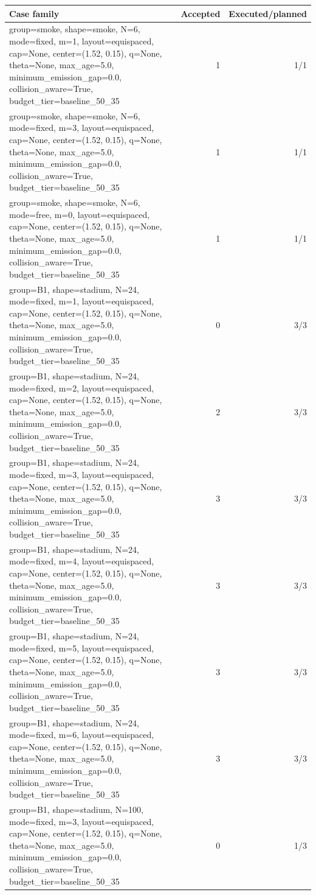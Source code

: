 \begin{tabular}{p{11cm}rr}
Case family & Accepted & Executed/planned \\
\hline
group=smoke, shape=smoke, N=6, mode=fixed, m=1, layout=equispaced, cap=None, center=(1.52, 0.15), q=None, theta=None, max\_age=5.0, minimum\_emission\_gap=0.0, collision\_aware=True, budget\_tier=baseline\_50\_35 & 1 & 1/1 \\
group=smoke, shape=smoke, N=6, mode=fixed, m=3, layout=equispaced, cap=None, center=(1.52, 0.15), q=None, theta=None, max\_age=5.0, minimum\_emission\_gap=0.0, collision\_aware=True, budget\_tier=baseline\_50\_35 & 1 & 1/1 \\
group=smoke, shape=smoke, N=6, mode=free, m=0, layout=equispaced, cap=None, center=(1.52, 0.15), q=None, theta=None, max\_age=5.0, minimum\_emission\_gap=0.0, collision\_aware=True, budget\_tier=baseline\_50\_35 & 1 & 1/1 \\
group=B1, shape=stadium, N=24, mode=fixed, m=1, layout=equispaced, cap=None, center=(1.52, 0.15), q=None, theta=None, max\_age=5.0, minimum\_emission\_gap=0.0, collision\_aware=True, budget\_tier=baseline\_50\_35 & 0 & 3/3 \\
group=B1, shape=stadium, N=24, mode=fixed, m=2, layout=equispaced, cap=None, center=(1.52, 0.15), q=None, theta=None, max\_age=5.0, minimum\_emission\_gap=0.0, collision\_aware=True, budget\_tier=baseline\_50\_35 & 2 & 3/3 \\
group=B1, shape=stadium, N=24, mode=fixed, m=3, layout=equispaced, cap=None, center=(1.52, 0.15), q=None, theta=None, max\_age=5.0, minimum\_emission\_gap=0.0, collision\_aware=True, budget\_tier=baseline\_50\_35 & 3 & 3/3 \\
group=B1, shape=stadium, N=24, mode=fixed, m=4, layout=equispaced, cap=None, center=(1.52, 0.15), q=None, theta=None, max\_age=5.0, minimum\_emission\_gap=0.0, collision\_aware=True, budget\_tier=baseline\_50\_35 & 3 & 3/3 \\
group=B1, shape=stadium, N=24, mode=fixed, m=5, layout=equispaced, cap=None, center=(1.52, 0.15), q=None, theta=None, max\_age=5.0, minimum\_emission\_gap=0.0, collision\_aware=True, budget\_tier=baseline\_50\_35 & 3 & 3/3 \\
group=B1, shape=stadium, N=24, mode=fixed, m=6, layout=equispaced, cap=None, center=(1.52, 0.15), q=None, theta=None, max\_age=5.0, minimum\_emission\_gap=0.0, collision\_aware=True, budget\_tier=baseline\_50\_35 & 3 & 3/3 \\
group=B1, shape=stadium, N=100, mode=fixed, m=3, layout=equispaced, cap=None, center=(1.52, 0.15), q=None, theta=None, max\_age=5.0, minimum\_emission\_gap=0.0, collision\_aware=True, budget\_tier=baseline\_50\_35 & 0 & 1/3 \\

\end{tabular}
